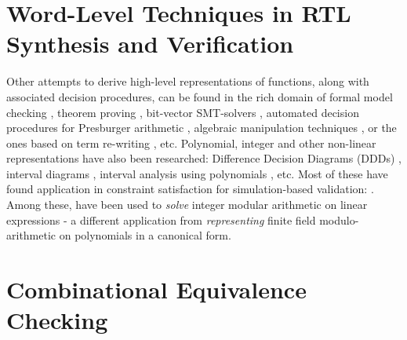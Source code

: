 \section{Word-Level Techniques in RTL Synthesis and Verification}

Other attempts to derive high-level representations of functions,
along with associated decision procedures, can be found in
the rich domain of formal model checking \cite{BHEL96} \cite{SMV},
theorem proving \cite{arditi:bmd}, bit-vector SMT-solvers
\cite{boolector} \cite{cvc3} \cite{z3} \cite{bitvector98}, automated
decision procedures for Presburger arithmetic \cite{presburger}
\cite{bultan:mixed_verification}, algebraic manipulation techniques 
\cite{devadas:algebraic_manipulation_iccd91}, or the ones based on
term re-writing \cite{AST}, etc. 
Polynomial, integer and other non-linear representations have also
been researched: Difference Decision Diagrams (DDDs) \cite{ddd-csl99} \cite{ddd-mt-98}, interval
diagrams \cite{interval_dd}, interval analysis using polynomials
\cite{polynomial_sanchez99}, etc. Most of these have found 
application in constraint satisfaction for simulation-based
validation:  \cite{Ritter99} \cite{hsat} \cite{lpsat}
\cite{brinkmann:asp-dac} \cite{Huang:tcad01} \cite{bitvector98}. Among
these, \cite{brinkmann:asp-dac} \cite{Huang:tcad01} \cite{bitvector98}
have been used to {\it solve} integer modular arithmetic on linear
expressions - a different application from {\it representing}
finite field modulo-arithmetic on polynomials in a canonical form.   


\section{Combinational Equivalence Checking}

